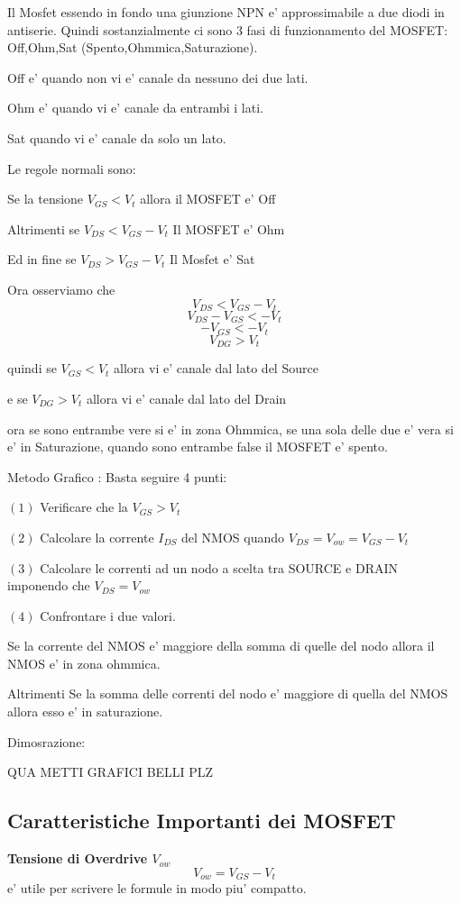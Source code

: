 \documentclass[\main/main.tex]{subfiles}
\begin{document}
Il Mosfet essendo in fondo una giunzione NPN e' approssimabile a due diodi in antiserie.
Quindi sostanzialmente ci sono 3 fasi di funzionamento del MOSFET: Off,Ohm,Sat (Spento,Ohmmica,Saturazione).

Off e' quando non vi e' canale da nessuno dei due lati.

Ohm e' quando vi e' canale da entrambi i lati.

Sat quando vi e' canale da solo un lato.

Le regole normali sono:

Se la tensione $V_{GS} < V_t$ allora il MOSFET e' Off

Altrimenti se  $V_{DS} < V_{GS} - V_t$ Il MOSFET e' Ohm

Ed in fine se  $V_{DS} > V_{GS} - V_t$ Il Mosfet e' Sat

Ora osserviamo che
\[V_{DS} < V_{GS} - V_t\]
\[V_{DS} - V_{GS} <  - V_t\]
\[-V_{GS} <  - V_t\]
\[V_{DG} > V_t\]

quindi se $V_{GS} < V_t$ allora vi e' canale dal lato del Source

e se $V_{DG} > V_t$ allora vi e' canale dal lato del Drain

ora se sono entrambe vere si e' in zona Ohmmica, se una sola delle due e' vera si e' in Saturazione, quando sono entrambe false il MOSFET e' spento.


Metodo Grafico :
Basta seguire 4 punti:

$(1)$ Verificare che la $V_{GS} > V_t$

$(2)$ Calcolare la corrente $I_{DS}$ del NMOS quando $V_{DS} = V_{ow} = V_{GS} - V_{t}$

$(3)$ Calcolare le correnti ad un nodo a scelta tra SOURCE e DRAIN imponendo che $V_{DS} = V_{ow}$

$(4)$ Confrontare i due valori.

Se la corrente del NMOS e' maggiore della somma di quelle del nodo allora il NMOS e' in zona ohmmica.

Altrimenti Se la somma delle correnti del nodo e' maggiore di quella del NMOS allora esso e' in saturazione.

Dimosrazione:

QUA METTI GRAFICI BELLI PLZ

\subsection{Caratteristiche Importanti dei MOSFET}
\textbf{Tensione di Overdrive $V_{ow}$}
\[ V_{ow} = V_{GS} - V_t\]
e' utile per scrivere le formule in modo piu' compatto.
\end{document}
